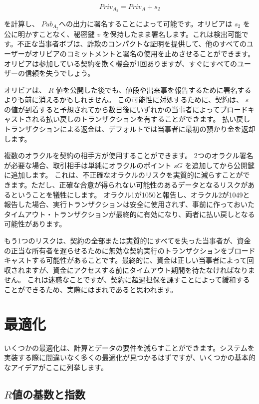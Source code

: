 \documentclass[11pt]{article}
\begin{document}
\[Priv_{A_2} =  Priv_{A} + s_{2}\]

を計算し、 \(Pub_{A_2}\)への出力に署名することによって可能です。オリビアは \(s_2\) を公に明かすことなく、秘密鍵 \(v\) を保持したまま署名します。これは検出可能です。不正な当事者ボブは、詐欺のコンパクトな証明を提供して、他のすべてのユーザーがオリビアのコミットメントと署名の使用を止めさせることができます。 オリビアは参加している契約を欺く機会が1回ありますが、すぐにすべてのユーザーの信頼を失うでしょう。

オリビアは、 \(R\) 値を公開した後でも、値段や出来事を報告するために署名するよりも前に消えるかもしれません。 この可能性に対処するために、契約は、 \(s\) の値が到着すると予想されてから数日後にいずれかの当事者によってブロードキャストされる払い戻しのトランザクションを有することができます。 払い戻しトランザクションによる返金は、デフォルトでは当事者に最初の預かり金を返却します。

複数のオラクルを契約の相手方が使用することができます。 2つのオラクル署名が必要な場合、取引相手は単純にオラクルのポイント \(sG\) を追加してから公開鍵に追加します。 これは、不正確なオラクルのリスクを実質的に減らすことができます。ただし、正確な合意が得られない可能性のあるデータとなるリスクがあるということを犠牲にします。 オラクル1が1050と報告し、オラクル2が1049と報告した場合、実行トランザクションは安全に使用されず、事前に作っておいたタイムアウト・トランザクションが最終的に有効になり、両者に払い戻しとなる可能性があります。

もう1つのリスクは、契約の全部または実質的にすべてを失った当事者が、資金の正当な所有者を遅らせるために無効な契約実行のトランザクションをブロードキャストする可能性があることです。最終的に、資金は正しい当事者によって回収されますが、資金にアクセスする前にタイムアウト期間を待たなければなりません。 これは迷惑なことですが、契約に超過担保を課すことによって緩和することができるため、実際にはまれであると思われます。

\section*{最適化}

いくつかの最適化は、計算とデータの要件を減らすことができます。システムを実装する際に間違いなく多くの最適化が見つかるはずですが、いくつかの基本的なアイデアがここに列挙します。

\subsection*{\(R\)値の基数と指数}
\end{document}
